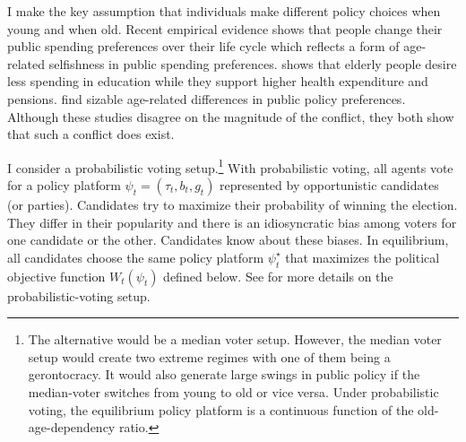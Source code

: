 I make the key assumption that individuals make different policy choices when young and when old. Recent empirical evidence shows that people change their public spending preferences over their life cycle which reflects a form of age-related selfishness in public spending preferences. \citet{Sorensen2013Aging} shows that elderly people desire less spending in education while they support higher health expenditure and pensions. \citet{Busemeyer2009Attitudes} find sizable age-related differences in public policy preferences. Although these studies disagree on the magnitude of the conflict, they both show that such a conflict does exist.

I consider a probabilistic voting setup.\footnote{The alternative would be a median voter setup. However, the median voter setup would create two extreme regimes with one of them being a gerontocracy. It would also generate large swings in public policy if the median-voter switches from young to old or vice versa. Under probabilistic voting, the equilibrium policy platform is a continuous function of the old-age-dependency ratio.} With probabilistic voting, all agents vote for a policy platform $\psi_t = (\tau_t, b_t, g_t)$ represented by opportunistic candidates (or parties). Candidates try to maximize their probability of winning the election. They differ in their popularity and there is an idiosyncratic bias among voters for one candidate or the other. Candidates know about these biases. In equilibrium, all candidates choose the same policy platform $\psi_t^\star$ that maximizes the political objective function $W_t(\psi_t)$ defined below. See \citet{Lindbeck1987Balanced} for more details on the probabilistic-voting setup.

